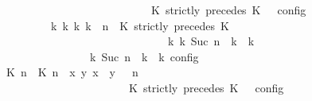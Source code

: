 \begin{isabellebody}
\ \ \ \ \ \ \ \ \ \ \ \ \ \ \ \ \ \ \ \ \ \ \ \ \ \ \ \ {\isasymturnstile}\ {\isasymPsi}\ {\isasymtriangleright}\ {\isacharparenleft}{\isacharparenleft}K\ strictly\ precedes\ K\ {\isacharhash}\ {\isasymPhi}{\isacharparenright}\ {\isasymrbrakk}\isactrlsub c\isactrlsub o\isactrlsub n\isactrlsub f\isactrlsub i\isactrlsub g\isanewline
\ \ \ \ \ \ \ \ \ \ \ \ {\isasymLongrightarrow}\ {\isacharparenleft}{\isasymexists}{\isasymGamma}\isactrlsub k\ {\isasymPsi}\isactrlsub k\ {\isasymPhi}\isactrlsub k\ k{\isachardot}\ {\isacharparenleft}{\isacharparenleft}{\isasymGamma}{\isacharcomma}\ n\ {\isasymturnstile}\ {\isacharparenleft}{\isacharparenleft}K\ strictly\ precedes\ K\ {\isacharhash}\ {\isasymPsi}{\isacharparenright}\ {\isasymtriangleright}\ {\isasymPhi}{\isacharparenright}\isanewline
\ \ \ \ \ \ \ \ \ \ \ \ \ \ \ \ \ \ \ \ \ \ \ \ \ \ \ \ \ \ \ \ \ \ {\isasymhookrightarrow}\isactrlbsup k\isactrlesup \ {\isacharparenleft}{\isasymGamma}\isactrlsub k{\isacharcomma}\ Suc\ n\ {\isasymturnstile}\ {\isasymPsi}\isactrlsub k\ {\isasymtriangleright}\ {\isasymPhi}\isactrlsub k{\isacharparenright}{\isacharparenright}\isanewline
\ \ \ \ \ \ \ \ \ \ \ \ \ \ \ \ {\isasymand}\ {\isacharparenleft}{\isasymrho}\ {\isasymin}\ {\isasymlbrakk}\ {\isasymGamma}\isactrlsub k{\isacharcomma}\ Suc\ n\ {\isasymturnstile}\ {\isasymPsi}\isactrlsub k\ {\isasymtriangleright}\ {\isasymPhi}\isactrlsub k\ {\isasymrbrakk}\isactrlsub c\isactrlsub o\isactrlsub n\isactrlsub f\isactrlsub i\isactrlsub g{\isacharparenright}{\isacharparenright}{\isacartoucheclose}\isanewline
\ \ \ \ \ \ \isamarkupfalse%
\ {\isacharminus}\isanewline
\ \ \ \ \ \ \ \ \isamarkupfalse%
\ {\isacartoucheopen}{\isasymrho}\ {\isasymin}\ {\isasymlbrakk}\ {\isacharparenleft}{\isacharparenleft}{\isasymlceil}{\isacharhash}\isactrlsup {\isasymle}\ K\ n{\isacharcomma}\ {\isacharhash}\isactrlsup {\isacharless}\ K\ n{\isasymrceil}\ {\isasymin}\ {\isacharparenleft}{\isasymlambda}{\isacharparenleft}x{\isacharcomma}\ y{\isacharparenright}{\isachardot}\ x\ {\isasymle}\ y{\isacharparenright}{\isacharparenright}\ {\isacharhash}\ {\isasymGamma}{\isacharparenright}{\isacharcomma}\ n\isanewline
\ \ \ \ \ \ \ \ \ \ \ \ \ \ \ \ \ \ \ \ \ \ \ \ {\isasymturnstile}\ {\isasymPsi}\ {\isasymtriangleright}\ {\isacharparenleft}{\isacharparenleft}K\ strictly\ precedes\ K\ {\isacharhash}\ {\isasymPhi}{\isacharparenright}\ {\isasymrbrakk}\isactrlsub c\isactrlsub o\isactrlsub n\isactrlsub f\isactrlsub i\isactrlsub g{\isacartoucheclose}\isanewline

\end{isabellebody}
